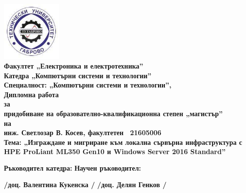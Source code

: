
\pagestyle{titlepage}

\title{}
\date{\vspace{-18ex}}
\maketitle

\begin{center}
	{\includegraphics[width=3cm]{images/logo.jpg}\\ \huge{\textbf{Факултет „Електроника и електротехника”}}\\ \huge{\textbf{Катедра „Компютърни системи и технологии”}}\\ \vspace*{0.5cm} \Large{\textbf{Специалност: „Компютърни системи и технологии”,}}\\
		\vspace*{1.5cm} \Huge{\textbf{Дипломна работа}}\\ \Large{\textbf{за}}\\ \Large{\textbf{придобиване на образователно-квалификационна степен „магистър”}}\\ \Large{\textbf{на}}\\ \Large{\textbf{инж. Светлозар В. Косев, факултетен \textnumero\ 21605006}}\\ \vspace*{0.7cm}
		\huge{\textbf{Тема: „Изграждане и мигриране към локална сървърна инфраструктура с HPE ProLiant ML350 Gen10 и Windows Server 2016 Standard”}}\\ \vspace*{1cm} \begin{flushleft}\large{\textbf{Ръководител катедра:}}\hspace{3cm} \large{\textbf{Научен ръководител:}}\end{flushleft} \begin{flushright}
			\Large{\textbf{\slash доц. Валентина Кукенска \slash}}\hspace{4cm} \Large{\textbf{\slash доц. Делян Генков \slash}}\end{flushright}
		
}
\end{center}

